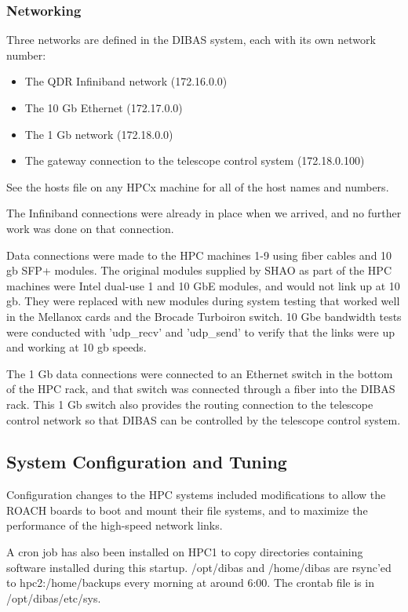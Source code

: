 \documentclass[11pt]{article}
\begin{document}
\subsubsection{Networking}

Three networks are defined in the DIBAS system, each with its own network number:
\begin{itemize}
\item The QDR Infiniband network (172.16.0.0)
\item The 10 Gb Ethernet (172.17.0.0)
\item The 1 Gb network (172.18.0.0)
\item The gateway connection to the telescope control system (172.18.0.100)
\end{itemize}
See the hosts file on any HPCx machine for all of the host names and numbers.

The Infiniband connections were already in place when we arrived, and no further work was done on that connection.

Data connections were made to the HPC machines 1-9 using fiber cables
and 10 gb SFP+ modules.  The original modules supplied by SHAO as part
of the HPC machines were Intel dual-use 1 and 10 GbE modules, and
would not link up at 10 gb.  They were replaced with new modules
during system testing that worked well in the Mellanox cards and the
Brocade Turboiron switch.  10 Gbe bandwidth tests were conducted with
'udp\_recv' and 'udp\_send' to verify that the links were up and working
at 10 gb speeds.

The 1 Gb data connections were connected to an Ethernet switch in the
bottom of the HPC rack, and that switch was connected through a fiber
into the DIBAS rack.  This 1 Gb switch also provides the routing
connection to the telescope control network so that DIBAS can be
controlled by the telescope control system.

\subsection{System Configuration and Tuning}
Configuration changes to the HPC systems included modifications to
allow the ROACH boards to boot and mount their file systems, and to
maximize the performance of the high-speed network links.

A cron job has also been installed on HPC1 to copy directories
containing software installed during this startup.  /opt/dibas and
/home/dibas are rsync'ed to hpc2:/home/backups every morning at around
6:00.  The crontab file is in /opt/dibas/etc/sys.
\end{document}
